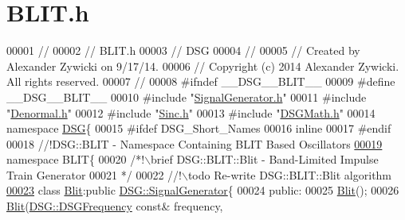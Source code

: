 \hypertarget{_b_l_i_t_8h_source}{\section{B\+L\+I\+T.\+h}
\label{_b_l_i_t_8h_source}
}

\begin{DoxyCode}
00001 \textcolor{comment}{//}
00002 \textcolor{comment}{//  BLIT.h}
00003 \textcolor{comment}{//  DSG}
00004 \textcolor{comment}{//}
00005 \textcolor{comment}{//  Created by Alexander Zywicki on 9/17/14.}
00006 \textcolor{comment}{//  Copyright (c) 2014 Alexander Zywicki. All rights reserved.}
00007 \textcolor{comment}{//}
00008 \textcolor{preprocessor}{#ifndef \_\_DSG\_\_BLIT\_\_}
00009 \textcolor{preprocessor}{#define \_\_DSG\_\_BLIT\_\_}
00010 \textcolor{preprocessor}{#include "\hyperlink{_signal_generator_8h}{SignalGenerator.h}"}
00011 \textcolor{preprocessor}{#include "\hyperlink{_denormal_8h}{Denormal.h}"}
00012 \textcolor{preprocessor}{#include "\hyperlink{_sinc_8h}{Sinc.h}"}
00013 \textcolor{preprocessor}{#include "\hyperlink{_d_s_g_math_8h}{DSGMath.h}"}
00014 \textcolor{keyword}{namespace }\hyperlink{namespace_d_s_g}{DSG}\{
00015 \textcolor{preprocessor}{#ifdef DSG\_Short\_Names}
00016     \textcolor{keyword}{inline}
00017 \textcolor{preprocessor}{#endif}
00018 \textcolor{comment}{    //!DSG::BLIT - Namespace Containing BLIT Based Oscillators}
\hypertarget{_b_l_i_t_8h_source_l00019}{}\hyperlink{namespace_d_s_g_1_1_b_l_i_t}{00019} \textcolor{comment}{}    \textcolor{keyword}{namespace }BLIT\{\textcolor{comment}{}
00020 \textcolor{comment}{        /*!\(\backslash\)brief DSG::BLIT::Blit - Band-Limited Impulse Train Generator}
00021 \textcolor{comment}{         */}\textcolor{comment}{}
00022 \textcolor{comment}{        //!\(\backslash\)todo Re-write DSG::BLIT::Blit algorithm}
\hypertarget{_b_l_i_t_8h_source_l00023}{}\hyperlink{class_d_s_g_1_1_b_l_i_t_1_1_blit}{00023} \textcolor{comment}{}        \textcolor{keyword}{class }\hyperlink{class_d_s_g_1_1_b_l_i_t_1_1_blit}{Blit}:\textcolor{keyword}{public} \hyperlink{class_d_s_g_1_1_signal_generator}{DSG::SignalGenerator}\{
00024         \textcolor{keyword}{public}:
00025             \hyperlink{class_d_s_g_1_1_b_l_i_t_1_1_blit_a1d9bed6285a8b3c0e073f3e3662716af}{Blit}();
00026             \hyperlink{class_d_s_g_1_1_b_l_i_t_1_1_blit_a1d9bed6285a8b3c0e073f3e3662716af}{Blit}(\hyperlink{namespace_d_s_g_a4315a061386fa1014fda09b15d3a6973}{DSG::DSGFrequency} \textcolor{keyword}{const}& frequency,

\end{DoxyCode}
